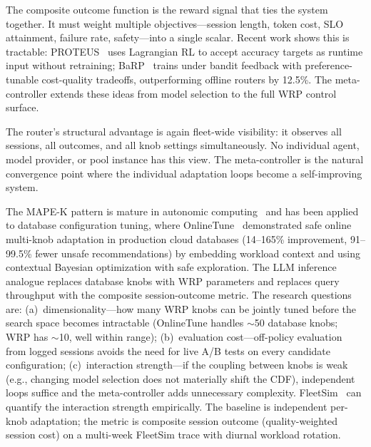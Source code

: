 \begin{opportunity}
The composite outcome function is the reward signal that ties the
system together.  It must weight multiple objectives---session
length, token cost, SLO attainment, failure rate, safety---into a
single scalar.  Recent work shows this is tractable:
PROTEUS~\cite{proteus2026} uses Lagrangian RL to accept accuracy
targets as runtime input without retraining;
BaRP~\cite{barp2025} trains under bandit feedback with
preference-tunable cost-quality tradeoffs, outperforming offline
routers by 12.5\%.  The meta-controller extends these ideas from
model selection to the full WRP control surface.

The router's structural advantage is again fleet-wide visibility:
it observes all sessions, all outcomes, and all knob settings
simultaneously.  No individual agent, model provider, or pool
instance has this view.  The meta-controller is the natural
convergence point where the individual adaptation loops become a
self-improving system.

\begin{frisk}
The MAPE-K pattern is mature in autonomic
computing~\cite{kephart2003autonomic} and has been applied to
database configuration tuning, where OnlineTune~\cite{onlinetune2022}
demonstrated safe online multi-knob adaptation in production cloud
databases (14--165\% improvement, 91--99.5\% fewer unsafe
recommendations) by embedding workload context and using contextual
Bayesian optimization with safe exploration.  The LLM inference
analogue replaces database knobs with WRP parameters and replaces
query throughput with the composite session-outcome metric.  The
research questions are: (a)~dimensionality---how many WRP knobs
can be jointly tuned before the search space becomes intractable
(OnlineTune handles $\sim$50 database knobs; WRP has $\sim$10,
well within range); (b)~evaluation cost---off-policy evaluation
from logged sessions avoids the need for live A/B tests on every
candidate configuration; (c)~interaction
strength---if the coupling between knobs is weak (e.g., changing
model selection does not materially shift the CDF), independent
loops suffice and the meta-controller adds unnecessary complexity.
FleetSim~\cite{fleetsim2026} can quantify the interaction strength
empirically.  The baseline is independent per-knob adaptation; the
metric is composite session outcome (quality-weighted session cost)
on a multi-week FleetSim trace with diurnal workload rotation.
\end{frisk}
\end{opportunity}


